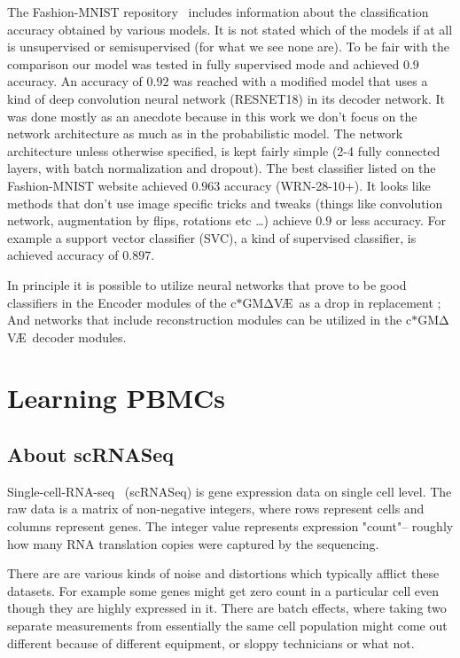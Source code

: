 \documentclass[11pt, a4paper]{report}
\theoremstyle{plain}
\theoremstyle{definition}
\theoremstyle{remark}
\newcommand{\gmvae}{c$\ast$GM$\mathrm{\Delta}$V\AE~}
\begin{document}
The Fashion-MNIST repository~\cite{fmnist} includes information about the
classification accuracy obtained by various models. It is not stated which of
the models if at all is unsupervised or semisupervised (for what we see none
are). To be fair with the comparison our model was tested in fully supervised
mode and achieved $0.9$ accuracy. An accuracy of $0.92$ was reached 
with a modified model that uses a kind of deep convolution neural network
(RESNET18\cite{he2016deep}) in its decoder network.
It was done mostly as an anecdote because in this work we don't focus on the
network architecture as much as in the probabilistic model. The network
architecture unless otherwise specified, is kept fairly simple (2-4 fully
connected layers, with batch normalization and dropout).
The best classifier listed on the
Fashion-MNIST website achieved $0.963$ accuracy (WRN-28-10+). It looks like
methods that don't use image specific tricks and tweaks (things like convolution
network, augmentation by flips, rotations etc \dots) achieve $0.9$ or less
accuracy. For example a support vector classifier (SVC), a kind of supervised
classifier, is achieved accuracy of $0.897$.

In principle it is possible to utilize neural networks that prove to be good
classifiers in the Encoder modules of the \gmvae as a drop in replacement
; And networks that include reconstruction modules can be utilized in the 
\gmvae decoder modules.

\chapter{Learning PBMCs}

\section{About scRNASeq}

Single-cell-RNA-seq~\cite{luecken2019current} (scRNASeq) is gene expression data
on single cell level. The raw data is a matrix of non-negative integers, where
rows represent cells and columns represent genes. The integer value represents
expression "count"-- roughly how many RNA translation copies were captured by
the sequencing. 

There are are various kinds of noise and distortions which typically afflict
these datasets. For example some genes might get zero count in a particular cell
even though they are highly expressed in it. There are batch effects, where
taking two separate measurements from essentially the same cell population 
might come out different because of different equipment, or 
sloppy technicians or what not.
\end{document}
